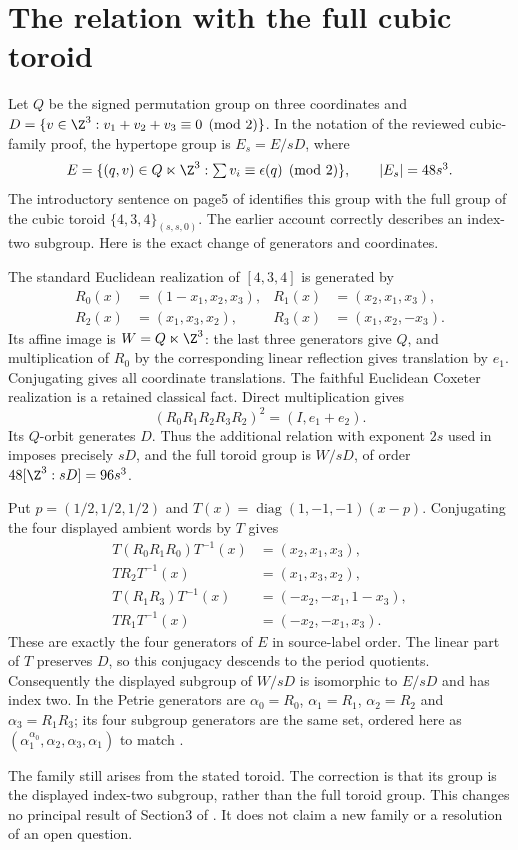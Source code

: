 \section{The relation with the full cubic toroid}
Let $Q$ be the signed permutation group on three coordinates and
$D=\{v\in\Z^3:v_1+v_2+v_3\equiv0\pmod2\}$. In the notation of the
reviewed cubic-family proof, the hypertope group is $E_s=E/sD$, where
\[
 E=\{(q,v)\in Q\ltimes\Z^3:\textstyle\sum v_i\equiv\epsilon(q)\pmod2\},
 \qquad |E_s|=48s^3.
\]
The introductory sentence on page5 of \cite{source} identifies this group with
the full group of the cubic toroid $\{4,3,4\}_{(s,s,0)}$. The earlier
account \cite[pp.~14--15]{earlier} correctly describes an index-two subgroup.
Here is the exact change of generators and coordinates.

The standard Euclidean realization of $[4,3,4]$ is generated by
\begin{align*}
 R_0(x)&=(1-x_1,x_2,x_3),&R_1(x)&=(x_2,x_1,x_3),\\
 R_2(x)&=(x_1,x_3,x_2),&R_3(x)&=(x_1,x_2,-x_3).
\end{align*}
Its affine image is $W=Q\ltimes\Z^3$: the last three generators give
$Q$, and multiplication of $R_0$ by the corresponding linear reflection
gives translation by $e_1$. Conjugating gives all coordinate translations.
The faithful Euclidean Coxeter realization is a retained classical fact.
Direct multiplication gives
\[
 (R_0R_1R_2R_3R_2)^2=(I,e_1+e_2).
\]
Its $Q$-orbit generates $D$. Thus the additional relation with exponent
$2s$ used in \cite{earlier} imposes precisely $sD$, and the full toroid group is
$W/sD$, of order $48[\Z^3:sD]=96s^3$.

Put $p=(1/2,1/2,1/2)$ and $T(x)=\operatorname{diag}(1,-1,-1)(x-p)$.
Conjugating the four displayed ambient words by $T$ gives
\begin{align*}
 T(R_0R_1R_0)T^{-1}(x)&=(x_2,x_1,x_3),\\
 TR_2T^{-1}(x)&=(x_1,x_3,x_2),\\
 T(R_1R_3)T^{-1}(x)&=(-x_2,-x_1,1-x_3),\\
 TR_1T^{-1}(x)&=(-x_2,-x_1,x_3).
\end{align*}
These are exactly the four generators of $E$ in source-label order.
The linear part of $T$ preserves $D$, so this conjugacy descends to the
period quotients. Consequently the displayed subgroup of $W/sD$ is
isomorphic to $E/sD$ and has index two. In \cite{earlier} the Petrie generators
are $\alpha_0=R_0$, $\alpha_1=R_1$, $\alpha_2=R_2$ and
$\alpha_3=R_1R_3$; its four subgroup generators are the same set,
ordered here as $(\alpha_1^{\alpha_0},\alpha_2,\alpha_3,\alpha_1)$ to match \cite{source}.

The family still arises from the stated toroid. The correction is that
its group is the displayed index-two subgroup, rather than the full
toroid group. This changes no principal result of Section3 of \cite{source}.
It does not claim a new family or a resolution of an open question.
